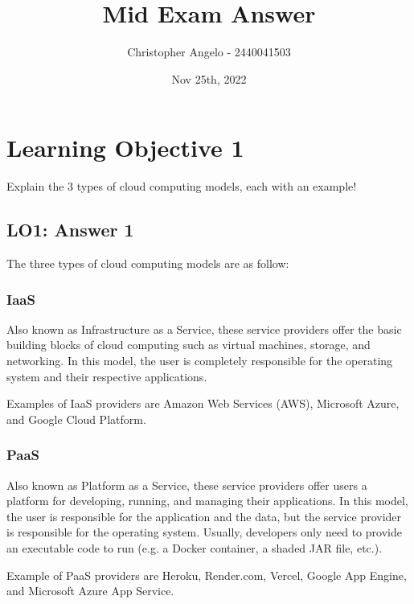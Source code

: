 \documentclass[
  11pt, %
]{assignment}
\author{Christopher Angelo - 2440041503}
\institute{BINUS University\\ Global Class}
\date{Nov 25th, 2022}
\title{Mid Exam Answer}
\begin{document}
\maketitle


\section*{Learning Objective 1}

\begin{problem}
Explain the 3 types of cloud computing models, each with an example!
\end{problem}

\subsection*{LO1: Answer 1}

The three types of cloud computing models are as follow:

\subsubsection*{IaaS} Also known as Infrastructure as a Service, these service providers offer the basic building blocks of cloud computing such as virtual machines, storage, and networking. In this model, the user is completely responsible for the operating system and their respective applications.

Examples of IaaS providers are Amazon Web Services (AWS), Microsoft Azure, and Google Cloud Platform.

\subsubsection*{PaaS} Also known as Platform as a Service, these service providers offer users a platform for developing, running, and managing their applications. In this model, the user is responsible for the application and the data, but the service provider is responsible for the operating system. Usually, developers only need to provide an executable code to run (e.g\@. a Docker container, a shaded JAR file, etc.).

Example of PaaS providers are Heroku, Render.com, Vercel, Google App Engine, and Microsoft Azure App Service.
\end{document}
